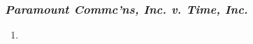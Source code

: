 \subsubsection{\emph{Paramount Commc'ns, Inc. v. Time, Inc.}}

\begin{enumerate}
    \item %
\end{enumerate}
